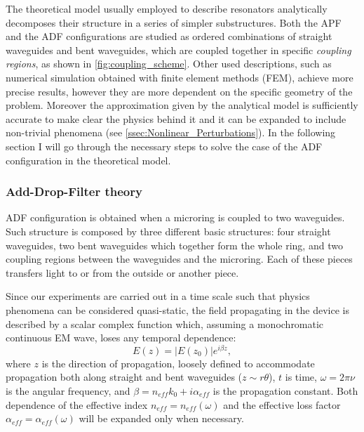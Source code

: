 The theoretical model usually employed to describe resonators analytically decomposes their structure in a series of simpler substructures.
Both the APF and the ADF configurations are studied as ordered combinations of straight waveguides and bent waveguides, which are coupled together in specific \textit{coupling regions}, as shown in \autoref{fig:coupling_scheme}.
Other used descriptions, such as numerical simulation obtained with finite element methods (FEM), achieve more precise results, however they are more dependent on the specific geometry of the problem.
Moreover the approximation given by the analytical model is sufficiently accurate to make clear the physics behind it and it can be expanded to include non-trivial phenomena (see \autoref{ssec:Nonlinear_Perturbations}).
In the following section I will go through the necessary steps to solve the case of the ADF configuration in the theoretical model.

\subsubsection{Add-Drop-Filter theory}
\label{sssec:Add-Drop-Filter_theory}
ADF configuration is obtained when a microring is coupled to two waveguides.
Such structure is composed by three different basic structures: four straight waveguides, two bent waveguides which together form the whole ring, and two coupling regions between the waveguides and the microring.
Each of these pieces transfers light to or from the outside or another piece.

Since our experiments are carried out in a time scale such that physics phenomena can be considered quasi-static, the field propagating in the device is described by a scalar complex function which, assuming a monochromatic continuous EM wave, loses any temporal dependence:
\begin{equation}
	E(z) = |E(z_0)|e^{i\beta z},
\end{equation}
where $z$ is the direction of propagation, loosely defined to accommodate propagation both along straight and bent waveguides ($z\sim r\theta$), $t$ is time, $\omega=2\pi\nu$ is the angular frequency, and $\beta = n_{eff}k_0+i\alpha_{eff}$ is the propagation constant.
Both dependence of the effective index $n_{eff}=n_{eff}\left(\omega\right)$ and the effective loss factor $\alpha_{eff}=\alpha_{eff}\left(\omega\right)$ will be expanded only when necessary.

